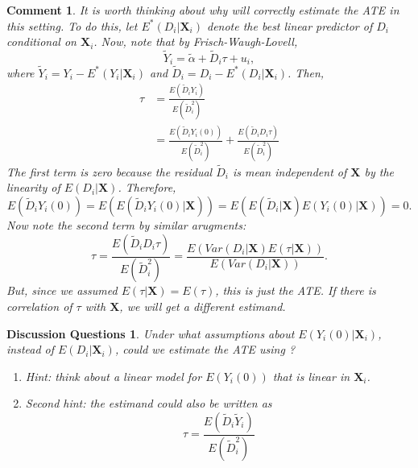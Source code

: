 \documentclass{tufte-handout}
\theoremstyle{break}
\newtheorem{cmt}{Comment}
\newtheorem{discussion}{Discussion Questions}
\newcommand{\bX}{\mathbf{X}}
\begin{document}
\begin{boxF}
\begin{cmt}
  \label{cmt:covariate_linear}
  It is worth thinking about why  will correctly estimate the ATE in this setting. To do this, let $E^{*}(D_{i} | \bX_{i})$ denote the best linear predictor of $D_{i}$ conditional on $\bX_{i}$. Now, note that by Frisch-Waugh-Lovell,
  \begin{equation}
    \tilde{Y}_{i} = \tilde{\alpha} + \tilde{D}_{i}\tau  + u_{i},
  \end{equation}
where $\tilde{Y}_{i} = Y_{i} - E^{*}(Y_{i}|\bX_{i})$ and $\tilde{D}_{i} = D_{i} - E^{*}(D_{i}|\bX_{i})$. Then,
\begin{align*}
  \tau &= \frac{E(\tilde{D}_{i}Y_{i})}{E(\tilde{D}_{i}^{2})}\\
   &= \frac{E(\tilde{D}_{i}Y_{i}(0))}{E(\tilde{D}_{i}^{2})} + \frac{E(\tilde{D}_{i}D_{i}\tau)}{E(\tilde{D}_{i}^{2})} 
\end{align*}
The first term is zero because the residual $\tilde{D}_{i}$ is mean independent of $\bX$ by the linearity of $E(D_{i}|\bX)$. Therefore, 
\begin{equation*}
  E(\tilde{D}_{i}Y_{i}(0)) = E(E(\tilde{D}_{i}Y_{i}(0)|\bX)) = E(E(\tilde{D}_{i}|\bX)E(Y_{i}(0)|\bX)) = 0.
\end{equation*}
Now note the second term by similar arugments:
\begin{equation*}
  \tau =  \frac{E(\tilde{D}_{i}D_{i}\tau)}{E(\tilde{D}_{i}^{2})} = \frac{E(Var(D_{i} | \bX)E(\tau|\bX))}{E(Var(D_{i} | \bX))}.
\end{equation*}
But, since we assumed $E(\tau|\bX) = E(\tau)$, this is just the ATE. If there is correlation of $\tau$ with $\bX$, we will get a different estimand.
\end{cmt}
\end{boxF}

\begin{boxK}
  \begin{discussion}
      Under what assumptions about $E(Y_{i}(0)|\bX_{i})$, instead of $E(D_{i}|\bX_{i})$, could we estimate the ATE using ? 
      \begin{enumerate}
        \item       Hint: think about a linear model for $E(Y_{i}(0))$ that is linear in $\bX_{i}$.\
        \item Second hint: the estimand could also be written as
  \begin{equation*}
  \tau = \frac{E(\tilde{D}_{i}\tilde{Y}_{i})}{E(\tilde{D}_{i}^{2})}
\end{equation*}    
    \end{enumerate}
  \end{discussion}
\end{boxK}
\end{document}
